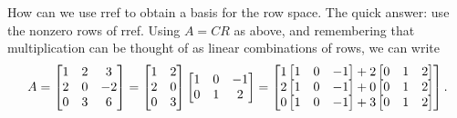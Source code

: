 \begin{example}
How can we use rref to obtain a basis for the row space. The quick answer: use the nonzero rows of rref. Using $A=CR$ as above, and remembering that multiplication can be thought of as linear combinations of rows, we can write  
\begin{align*}
A
=
\begin{bmatrix}
\begin{matrix} 1\\2\\0 \end{matrix}
&\begin{matrix} 2\\0\\3 \end{matrix}
&\begin{matrix} 3\\-2\\6 \end{matrix}
\end{bmatrix}
=
\begin{bmatrix}
\begin{matrix} 1\\2\\0 \end{matrix}
&\begin{matrix} 2\\0\\3 \end{matrix}
\end{bmatrix}
\begin{bmatrix}
\begin{matrix} 1\\0 \end{matrix}
&\begin{matrix} 0\\1 \end{matrix}
&\begin{matrix} -1\\2 \end{matrix}
\end{bmatrix}
=
\begin{bmatrix}
1\begin{bmatrix}1&0&-1\end{bmatrix} + 2 \begin{bmatrix}0&1&2\end{bmatrix}\\
2\begin{bmatrix}1&0&-1\end{bmatrix} + 0 \begin{bmatrix}0&1&2\end{bmatrix}\\
0\begin{bmatrix}1&0&-1\end{bmatrix} + 3 \begin{bmatrix}0&1&2\end{bmatrix}
\end{bmatrix}
.
\end{align*}
\marginpar{
}
\end{example}
